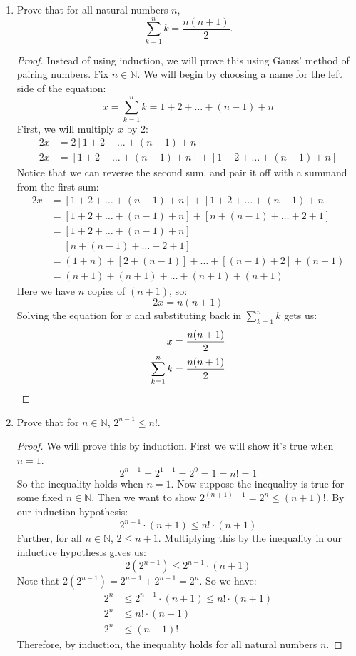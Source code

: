 \documentclass[12pt]{amsart}
\begin{document}
\begin{enumerate}
\item Prove that for all natural numbers $n$,
%
\[ \sum_{k=1}^n k = \frac{n(n+1)}{2}. \]
  
\begin{proof}
Instead of using induction, we will prove this using Gauss' method of pairing numbers. Fix $n\in \mathbb N$. We will begin by choosing a name for the left side of the equation:
\[ x = \sum_{k=1}^n k = 1 + 2 + \ldots + (n-1) + n \]
First, we will multiply $x$ by 2:
\begin{align*}
 2x& = 2[1 + 2 + \ldots + (n-1) + n] \\
 2x& = [1 + 2 + \ldots + (n-1) + n] + [1 + 2 + \ldots + (n-1) + n]
\end{align*}
Notice that we can reverse the second sum, and pair it off with a summand from the first sum:
\begin{equation*}
\begin{split}
 2x& = [1 + 2 + \ldots + (n-1) + n] + [1 + 2 + \ldots + (n-1) + n] \\
 & = [1 + 2 + \ldots + (n-1) + n] + [n + (n-1) + \ldots + 2 + 1] \\
 & = [1 + 2 + \ldots + (n-1) + n] \\
 & \quad\,\, [n + (n-1) + \ldots + 2 + 1] \\
 & = (1+n) + [2+(n-1)] + \ldots + [(n-1)+2] + (n+1) \\
 & = (n+1) + (n+1) + \ldots + (n+1) + (n+1)
\end{split}
\end{equation*}
Here we have $n$ copies of $(n+1)$, so:
\[ 2x = n(n+1) \]
Solving the equation for $x$ and substituting back in $\sum_{k=1}^n k$ gets us:
\begin{align*}
x & = {{n(n+1)}\over{2}} \\
{\sum_{k=1}^n k} & = {n(n+1)\over{2}}
\end{align*}
\end{proof}

\item  Prove that for $n\in \mathbb N$, $2^{n-1} \leq n!$.
  
\begin{proof}
We will prove this by induction. First we will show it's true when $n=1$.
\[ 2^{n-1} = 2^{1-1} = 2^0 = 1 = n! = 1 \]
So the inequality holds when $n=1$. Now suppose the inequality is true for some fixed $n\in \mathbb N$. Then we want to show $2^{(n+1)-1} = 2^n \leq (n+1)!$. By our induction hypothesis:
\[ 2^{n-1}\cdot (n+1) \leq n!\cdot (n+1) \]
Further, for all $n\in \mathbb N$, $2 \leq n+1$. Multiplying this by the inequality in our inductive hypothesis gives us:
\[ 2(2^{n-1}) \leq 2^{n-1} \cdot (n+1) \]
Note that $2(2^{n-1}) = 2^{n-1} + 2^{n-1} = 2^n$. So we have:
\begin{align*}
2^n& \leq 2^{n-1} \cdot (n+1) \leq n!\cdot (n+1) \\
2^n& \leq n!\cdot (n+1) \\
2^n& \leq (n+1)!
\end{align*}
Therefore, by induction, the inequality holds for all natural numbers $n$.
\end{proof}


\end{enumerate}
\end{document}
